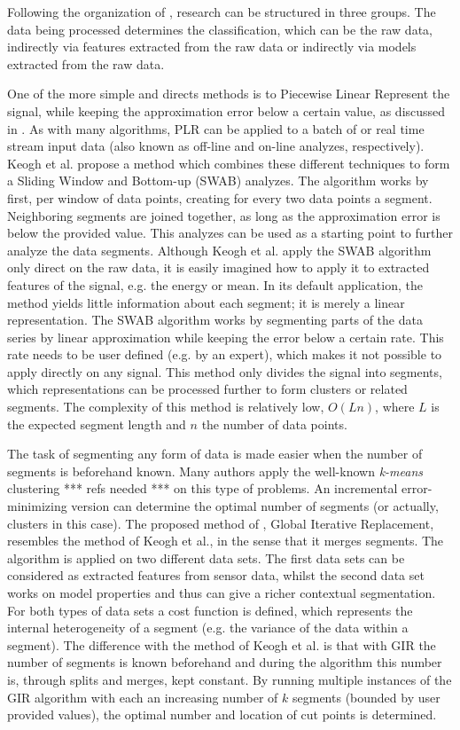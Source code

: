 Following the organization of \cite{warren2005clustering}, research can be structured in three groups.
The data being processed determines the classification, which can be the raw data, indirectly via features extracted from the raw data or indirectly via models extracted from the raw data.

One of the more simple and directs methods is to Piecewise Linear Represent the signal, while keeping the approximation error below a certain value, as discussed in \cite{keogh2001online}.
As with many algorithms, PLR can be applied to a batch of or real time stream input data (also known as off-line and on-line analyzes, respectively).
Keogh et al. propose a method which combines these different techniques to form a Sliding Window and Bottom-up (SWAB) analyzes.
The algorithm works by first, per window of data points, creating for every two data points a segment.
Neighboring segments are joined together, as long as the approximation error is below the provided value.
This analyzes can be used as a starting point to further analyze the data segments.
Although Keogh et al. apply the SWAB algorithm only direct on the raw data, it is easily imagined how to apply it to extracted features of the signal, e.g. the energy or mean.
In its default application, the method yields little information about each segment; it is merely a linear representation.
The SWAB algorithm works by segmenting parts of the data series by linear approximation while keeping the error below a certain rate.
This rate needs to be user defined (e.g. by an expert), which makes it not possible to apply directly on any signal.
This method only divides the signal into segments, which representations can be processed further to form clusters or related segments.
The complexity of this method is relatively low, $O(Ln)$, where $L$ is the expected segment length and $n$ the number of data points.

The task of segmenting any form of data is made easier when the number of segments is beforehand known.
Many authors apply the well-known \emph{k-means} clustering *** refs needed *** on this type of problems.
An incremental error-minimizing version can determine the optimal number of segments (or actually, clusters in this case).
The proposed method of \cite{himberg2001time}, Global Iterative Replacement, resembles the method of Keogh et al., in the sense that it merges segments.
The algorithm is applied on two different data sets.
The first data sets can be considered as extracted features from sensor data, whilst the second data set works on model properties and thus can give a richer contextual segmentation.
For both types of data sets a cost function is defined, which represents the internal heterogeneity of a segment (e.g. the variance of the data within a segment).
The difference with the method of Keogh et al. is that with GIR the number of segments is known beforehand and during the algorithm this number is, through splits and merges, kept constant.
By running multiple instances of the GIR algorithm with each an increasing number of $k$ segments (bounded by user provided values), the optimal number and location of cut points is determined.

